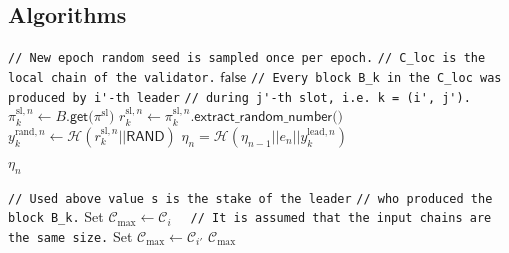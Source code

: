 \newpage

\subsection{Algorithms}\label{subsec:algorithms}

\begin{algorithm}[ht]
    \begin{algorithmic}[1]
        \caption{${\mathcal{F}_{\text{LB}}(e_n, C_{\text{loc}})}$}
        \State \lstinline|// New epoch random seed is sampled once per epoch.|
        \State \lstinline|// C_loc is the local chain of the validator.|
            \State \Return ${\textsf{false}}$
        \EndIf
            \State \lstinline|// Every block B_k in the C_loc was produced by i'-th leader|
            \State \lstinline|// during j'-th slot, i.e. k = (i', j').|
            \State ${\pi_k^{\text{sl}, n} \leftarrow B\textsf{.get(}\pi^{\text{sl}}\textsf{)}}$
            \State ${r_k^{\text{sl}, n} \leftarrow \pi_k^{\text{sl}, n}\textsf{.extract\_random\_number()}}$
            \State $y_k^{\text{rand}, n} \leftarrow \mathcal{H}(r_k^{\text{sl}, n} || \textsf{RAND})$
            \State ${\eta_n = \mathcal{H}(\eta_{n - 1} || e_n || y_k^{\text{lead}, n})}$

        \EndFor
        \State \Return $\eta_n$
    \end{algorithmic}\label{alg:algorithm-3}
\end{algorithm}

\begin{algorithm}[ht]
    \begin{algorithmic}[1]
        \caption{${\textsf{MaxStakeChain}(\mathcal{C}_i}, \mathcal{C}_{i'})$}
            \State \lstinline|// Used above value s is the stake of the leader|
            \State \lstinline|// who produced the block B_k.|
            \State Set ${\mathcal{C}_{\max} \leftarrow \mathcal{C}_{i}}$
        \Else
            \lstinline|  // It is assumed that the input chains are the same size.|
            \State Set ${\mathcal{C}_{\max} \leftarrow \mathcal{C}_{i'}}$
        \EndIf
        \State \Return ${\mathcal{C}_{\max}}$
    \end{algorithmic}\label{alg:algorithm-4}
\end{algorithm}

